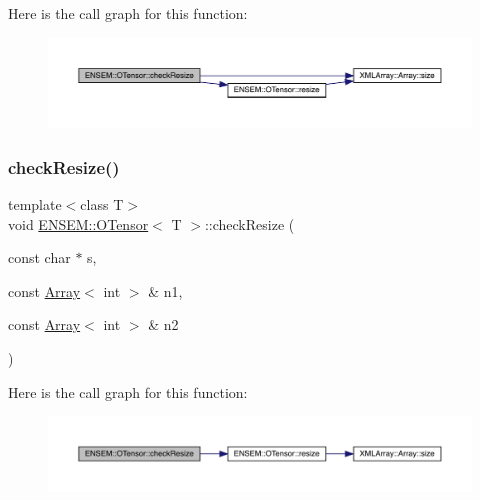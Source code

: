 Here is the call graph for this function\+:
\nopagebreak
\begin{figure}[H]
\begin{center}
\leavevmode
\includegraphics[width=350pt]{da/d8a/classENSEM_1_1OTensor_aa273eae7f1de4b37e91302da5edf279b_cgraph}
\end{center}
\end{figure}
\mbox{\label{classENSEM_1_1OTensor_a0f656f8ef2b19a258a8c86a4e80ea902}} 
\subsubsection{\texorpdfstring{checkResize()}{checkResize()}\hspace{0.1cm}{\footnotesize\ttfamily [3/4]}}
{\footnotesize\ttfamily template$<$class T$>$ \\
void \mbox{\hyperlink{classENSEM_1_1OTensor}{E\+N\+S\+E\+M\+::\+O\+Tensor}}$<$ T $>$\+::check\+Resize (\begin{DoxyParamCaption}\item[{const char $\ast$}]{s,  }\item[{const \mbox{\hyperlink{classXMLArray_1_1Array}{Array}}$<$ int $>$ \&}]{n1,  }\item[{const \mbox{\hyperlink{classXMLArray_1_1Array}{Array}}$<$ int $>$ \&}]{n2 }\end{DoxyParamCaption})\hspace{0.3cm}{\ttfamily [inline]}}

Here is the call graph for this function\+:
\nopagebreak
\begin{figure}[H]
\begin{center}
\leavevmode
\includegraphics[width=350pt]{da/d8a/classENSEM_1_1OTensor_a0f656f8ef2b19a258a8c86a4e80ea902_cgraph}
\end{center}
\end{figure}
\mbox{\label{classENSEM_1_1OTensor_a0f656f8ef2b19a258a8c86a4e80ea902}} 
